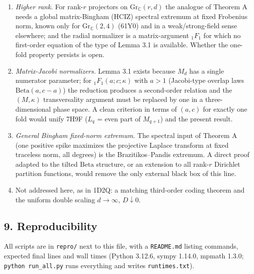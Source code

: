 \documentclass[
  11pt,
  a4paper,
]{article}
\providecommand{\tightlist}{%
  \setlength{\itemsep}{0pt}\setlength{\parskip}{0pt}}
\begin{document}
\begin{enumerate}
\def\labelenumi{\arabic{enumi}.}
\tightlist
\item
  \emph{Higher rank.} For rank-\(r\) projectors on
  \(\mathrm{Gr}_{\mathbb C}(r,\allowbreak{}d)\) the analogue of Theorem A needs a
  global matrix-Bingham (HCIZ) spectral extremum at fixed Frobenius
  norm, known only for \(\mathrm{Gr}_{\mathbb C}(2,\allowbreak{}4)\) (61Y0) and in a
  weak/strong-field sense elsewhere; and the radial normalizer is a
  matrix-argument \({}_1F_1\) for which no first-order equation of the
  type of Lemma 3.1 is available. Whether the one-fold property persists
  is open.
\item
  \emph{Matrix-Jacobi normalizers.} Lemma 3.1 exists because \(M_d\) has
  a single numerator parameter; for \({}_1F_1(a;\allowbreak{}c;\allowbreak{}\kappa)\) with \(a>1\)
  (Jacobi-type overlap laws \(\mathrm{Beta}(a,\allowbreak{}c-a)\)) the reduction
  produces a second-order relation and the \((M,\allowbreak{}\kappa)\) transversality
  argument must be replaced by one in a three-dimensional phase space. A
  clean criterion in terms of \((a,\allowbreak{}c)\) for exactly one fold would unify
  7H9F (\(L_q\) = even part of \(M_{q+1}\)) and the present result.
\item
  \emph{General Bingham fixed-norm extremum.} The spectral input of
  Theorem A (one positive spike maximizes the projective Laplace
  transform at fixed traceless norm, all degrees) is the
  Brazitikos--Pandis extremum. A direct proof adapted to the tilted
  \(\mathrm{Beta}\) structure, or an extension to all rank-\(r\)
  Dirichlet partition functions, would remove the only external black
  box of this line.
\item
  Not addressed here, as in 1D2Q: a matching third-order coding theorem
  and the uniform double scaling \(d\to\infty\), \(D\downarrow0\).
\end{enumerate}

\subsection{9. Reproducibility}\label{reproducibility}

All scripts are in {\small\texttt{repro/\allowbreak{}}} next to this file, with a
{\small\texttt{README.\allowbreak{}md}} listing commands, expected final lines and wall times
(Python 3.12.6, sympy 1.14.0, mpmath 1.3.0; {\small\texttt{python\ run\_\allowbreak{}all.\allowbreak{}py}}
runs everything and writes {\small\texttt{runtimes.\allowbreak{}txt}}).
\end{document}
